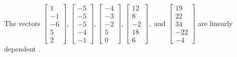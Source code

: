 \begin{exercise}
\begin{exerciseStatement}
  \end{exerciseStatement}
  \begin{exerciseAnswer}
   The vectors \(\left[\begin{array}{r}
1 \\
-1 \\
-6 \\
5 \\
2
\end{array}\right] , \left[\begin{array}{r}
-5 \\
-5 \\
-5 \\
-4 \\
-1
\end{array}\right] , \left[\begin{array}{r}
-4 \\
-3 \\
-2 \\
5 \\
0
\end{array}\right] , \left[\begin{array}{r}
12 \\
8 \\
-2 \\
18 \\
6
\end{array}\right] , \text{ and } \left[\begin{array}{r}
19 \\
22 \\
34 \\
-22 \\
-4
\end{array}\right]\) are 
  	 linearly dependent  .
  


  \end{exerciseAnswer}
\end{exercise}